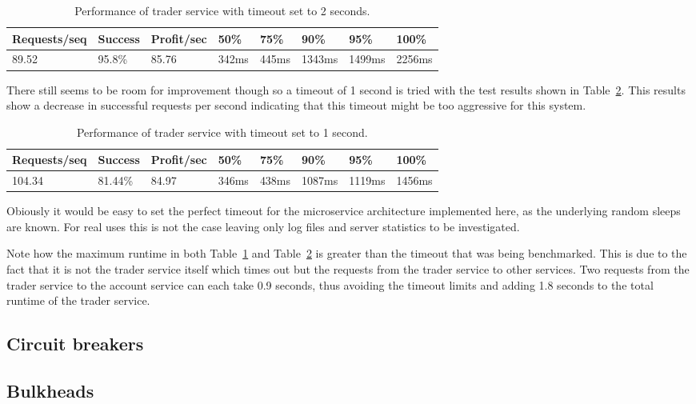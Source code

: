 \begin{table}[]
\centering
\caption{Performance of trader service with timeout set to 2 seconds.}
\label{table:timeouttest2sec}
\begin{tabular}{|l|l|l|l|l|l|l|l|}
\hline
Requests/seq & Success & Profit/sec & 50\% & 75\% & 90\% & 95\% & 100\% \\ \hline
89.52 & 95.8\% & 85.76 & 342ms & 445ms & 1343ms & 1499ms & 2256ms\\ \hline
\end{tabular}
\end{table}
There still seems to be room for improvement though so a timeout of 1
second is tried with the test results shown in
Table~\ref{table:timeouttest1sec}. This results show a decrease in
successful requests per second indicating that this timeout might be
too aggressive for this system.
\begin{table}[]
\centering
\caption{Performance of trader service with timeout set to 1 second.}
\label{table:timeouttest1sec}
\begin{tabular}{|l|l|l|l|l|l|l|l|}
\hline
Requests/seq & Success & Profit/sec & 50\% & 75\% & 90\% & 95\% & 100\% \\ \hline
104.34 & 81.44\% & 84.97 & 346ms & 438ms & 1087ms & 1119ms & 1456ms\\ \hline
\end{tabular}
\end{table}
Obiously it would be easy to set the perfect timeout for the
microservice architecture implemented here, as the underlying random
sleeps are known. For real uses this is not the case leaving only log
files and server statistics to be investigated.

Note how the maximum runtime in both Table~\ref{table:timeouttest2sec}
and Table~\ref{table:timeouttest1sec} is greater than the timeout that
was being benchmarked. This is due to the fact that it is not the
trader service itself which times out but the requests from the trader
service to other services. Two requests from the trader service to the
account service can each take 0.9 seconds, thus avoiding the timeout
limits and adding 1.8 seconds to the total runtime of the trader service.

\subsection{Circuit breakers}

\subsection{Bulkheads}
